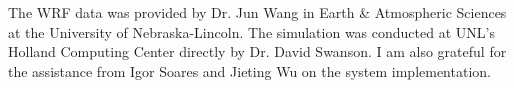 \documentclass[print]{nuthesis}
\begin{document}



\tableofcontents
\mainmatter










\backmatter

\appendix

\begin{acknowledgments}
The WRF data was provided by Dr. Jun Wang in Earth \& Atmospheric Sciences at the University of Nebraska-Lincoln. The simulation was conducted at UNL's Holland Computing Center directly by Dr. David Swanson. I am also grateful for the assistance from Igor Soares and Jieting Wu on the system implementation.
\end{acknowledgments}



\nocite{*}

\end{document}
